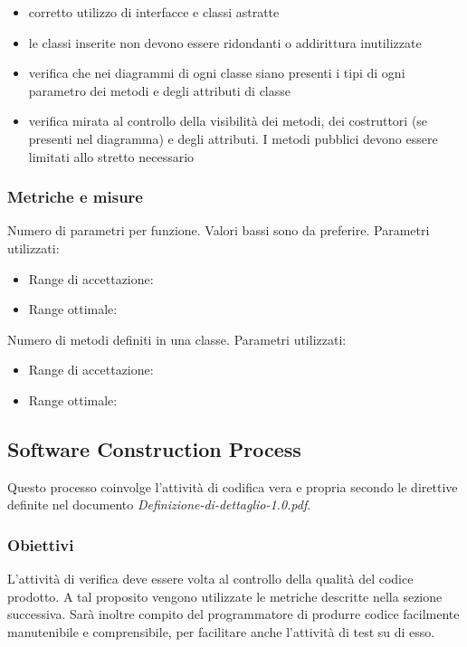 \documentclass[a4paper,11pt]{article}
\begin{document}
\begin{itemize}
\begin{itemize}
\item corretto utilizzo di interfacce e classi astratte
\item le classi inserite non devono essere ridondanti o addirittura inutilizzate
\item verifica che nei diagrammi di ogni classe siano presenti i tipi di ogni parametro dei metodi e degli attributi di classe
\item verifica mirata al controllo della visibilità dei metodi, dei costruttori (se presenti nel diagramma) e degli attributi. I metodi pubblici devono essere limitati allo stretto necessario
\end{itemize}
\subsubsection{Metriche e misure}
Numero di parametri per funzione. Valori bassi sono da preferire.
Parametri utilizzati:
\begin{itemize}
	\item Range di accettazione: \begin{math}[0 - 7]\end{math}
	\item Range ottimale: \begin{math}[0 - 5]\end{math}
	\end{itemize}
Numero di metodi definiti in una classe.
Parametri utilizzati:
\begin{itemize}
	\item Range di accettazione: \begin{math}[1 - 7]\end{math}
	\item Range ottimale: \begin{math}[1 - 10]\end{math}
	\end{itemize}
\subsection{Software Construction Process}
Questo processo coinvolge l'attività di codifica vera e propria secondo le direttive definite nel documento \textit{Definizione-di-dettaglio-1.0.pdf}.
\subsubsection{Obiettivi}
L'attività di verifica deve essere volta al controllo della qualità del codice prodotto. A tal proposito vengono utilizzate le metriche descritte nella sezione successiva. Sarà inoltre compito del programmatore di produrre codice facilmente manutenibile e comprensibile, per facilitare anche l'attività di test su di esso.

\end{itemize}
\end{document}
